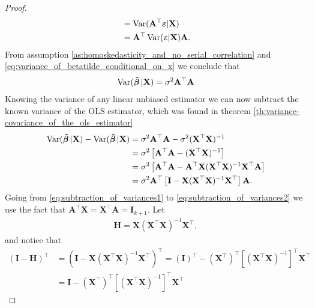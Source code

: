 \begin{proof}
\begin{align}
        &= \operatorname{\text{Var}}(\mathbf{A}^\top\boldsymbol{\varepsilon}|\mathbf{X}) \nonumber\\
        &= \mathbf{A}^\top\operatorname{\text{Var}}(\boldsymbol{\varepsilon}|\mathbf{X})\mathbf{A}.\label{eq:variance_of_betatilde_conditional_on_x}
    \end{align}
    From assumption \ref{as:homoskedasticity_and_no_serial_correlation} and \eqref{eq:variance_of_betatilde_conditional_on_x} we conclude that
    \begin{align}
        \operatorname{\text{Var}}(\operatorname{\boldsymbol{\Tilde{\beta}}}|\mathbf{X}) = \sigma^2\mathbf{A}^\top\mathbf{A}
    \end{align}
    Knowing the variance of any linear unbiased estimator we can now subtract the known variance of the OLS estimator, which was found in theorem \ref{th:variance-covariance_of_the_ols_estimator}
    \begin{align}
        \operatorname{\text{Var}}(\operatorname{\boldsymbol{\Tilde{\beta}}}|\mathbf{X}) - \operatorname{\text{Var}}(\operatorname{\boldsymbol{\hat{\beta}}}|\mathbf{X}) &= \sigma^2\mathbf{A}^\top\mathbf{A} - \sigma^2(\mathbf{X}^\top\mathbf{X})^{-1} \nonumber \\
        &= \sigma^2\left[\mathbf{A}^\top\mathbf{A} - (\mathbf{X}^\top\mathbf{X})^{-1} \right] \label{eq:subtraction_of_variances1} \\
        &= \sigma^2\left[\mathbf{A}^\top\mathbf{A} - \mathbf{A}^\top\mathbf{X}(\mathbf{X}^\top\mathbf{X})^{-1}\mathbf{X}^\top\mathbf{A} \right] \label{eq:subtraction_of_variances2} \\
        &= \sigma^2\mathbf{A}^\top\left[\mathbf{I} - \mathbf{X}(\mathbf{X}^\top\mathbf{X})^{-1}\mathbf{X}^\top \right]\mathbf{A}.\label{eq:subtraction_of_variances3}
    \end{align}
    Going from \eqref{eq:subtraction_of_variances1} to \eqref{eq:subtraction_of_variances2} we use the fact that $\mathbf{A}^\top\mathbf{X} = \mathbf{X}^\top\mathbf{A} = \mathbf{I}_{k+1}$.
    Let 
    \begin{align}\label{eq:projection_matrix}
    \mathbf{H} = \mathbf{X}(\mathbf{X}^\top\mathbf{X})^{-1}\mathbf{X}^\top,
    \end{align}
    and notice that
    \begin{align*}
        \left(\mathbf{I} - \mathbf{H}\right)^\top &= (\mathbf{I} - \mathbf{X}(\mathbf{X}^\top\mathbf{X})^{-1}\mathbf{X}^\top)^\top 
        = (\mathbf{I})^\top - \left(\mathbf{X}^\top\right)^\top\left[(\mathbf{X}^\top\mathbf{X})^{-1}\right]^\top\mathbf{X}^\top \\
        &= \mathbf{I} - \left(\mathbf{X}^\top\right)^\top\left[(\mathbf{X}^\top\mathbf{X})^{-1}\right]^\top\mathbf{X}^\top

\end{align*}
\end{proof}
